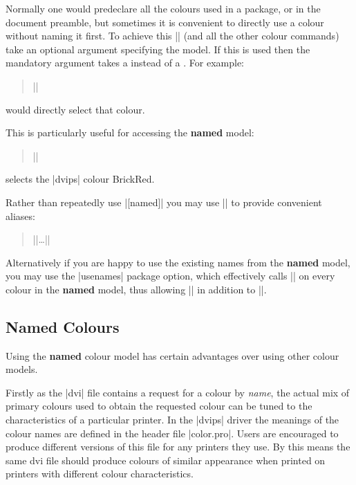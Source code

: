 
Normally one would predeclare all the colours used in a package, or in
the document preamble, but sometimes it is convenient to directly use
a colour without naming it first. To achieve this |\color| (and all
the other colour commands) take an optional argument specifying the
model. If this is used then the mandatory argument takes a
 instead of a . For example:
\begin{quote}
  |\color[rgb]{1,0.2,0.3}|
\end{quote}
would directly select that colour.

This is particularly useful for accessing the \textbf{named} model:
\begin{quote}
  |\color[named]{BrickRed}|
\end{quote}
selects the |dvips| colour BrickRed.

Rather than repeatedly use |[named]| you may use |\definecolor| to
provide convenient aliases:
\begin{quote}
  ||\ldots |\color{myred}|\kern-10pt
\end{quote}
Alternatively if you are happy to use the existing names from the
\textbf{named} model, you may use the |usenames| package option, which
effectively calls |\definecolor| on every colour in the \textbf{named}
model, thus allowing |\color{WildStrawberry}| in addition to
|\color[named]{WildStrawbery}|.

\subsection{Named Colours}
Using the \textbf{named} colour model has certain advantages over
using other colour models.

Firstly as the |dvi| file contains a request
for a colour by \emph{name}, the actual mix of primary colours used to
obtain the requested colour can be tuned to the characteristics of a
particular printer. In the |dvips| driver the meanings of the colour
names are defined in the header file |color.pro|. Users are encouraged
to produce different versions of this file for any printers they use. By
this means the same dvi file should produce colours of similar
appearance when printed on printers with different colour
characteristics.

